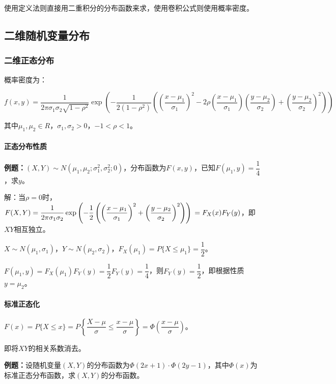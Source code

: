 \documentclass[UTF8, 12pt]{ctexart}
\begin{document}
使用定义法则直接用二重积分的分布函数来求，使用卷积公式则使用概率密度。

\subsection{二维随机变量分布}

\subsubsection{二维正态分布}

概率密度为：

{\fontsize{8.2pt}{10pt}$f(x,y)=\dfrac{1}{2\pi\sigma_1\sigma_2\sqrt{1-\rho^2}}\exp\left(-\dfrac{1}{2(1-\rho^2)}\left(\left(\dfrac{x-\mu_1}{\sigma_1}\right)^2-2\rho\left(\dfrac{x-\mu_1}{\sigma_1}\right)\left(\dfrac{y-\mu_2}{\sigma_2}\right)+\left(\dfrac{y-\mu_2}{\sigma_2}\right)^2\right)\right)$}

其中$\mu_1,\mu_2\in R$，$\sigma_1,\sigma_2>0$，$-1<\rho<1$。

\paragraph{正态分布性质} \leavevmode \medskip

\textbf{例题：}$(X,Y)\sim N(\mu_1,\mu_2;\sigma_1^2,\sigma_2^2;0)$，分布函数为$F(x,y)$，已知$F(\mu_1,y)=\dfrac{1}{4}$，求$y$。

解：当$\rho=0$时，$F(X,Y)=\dfrac{1}{2\pi\sigma_1\sigma_2}\exp\left(-\dfrac{1}{2}\left(\left(\dfrac{x-\mu_1}{\sigma_1}\right)^2+\left(\dfrac{y-\mu_2}{\sigma_2}\right)^2\right)\right)\\=F_X(x)F_Y(y)$，即$XY$相互独立。

$X\sim N(\mu_1,\sigma_1)$，$Y\sim N(\mu_2,\sigma_2)$，$F_X(\mu_1)=P\{X\leqslant\mu_1\}=\dfrac{1}{2}$。

$F(\mu_1,y)=F_X(\mu_1)F_Y(y)=\dfrac{1}{2}F_Y(y)=\dfrac{1}{4}$，则$F_Y(y)=\dfrac{1}{2}$，即根据性质$y=\mu_2$。

\paragraph{标准正态化} \leavevmode \medskip

$F(x)=P\{X\leqslant x\}=P\left\{\dfrac{X-\mu}{\sigma}\leqslant\dfrac{x-\mu}{\sigma}\right\}=\varPhi\left(\dfrac{x-\mu}{\sigma}\right)$。

即将$XY$的相关系数消去。

\textbf{例题：}设随机变量$(X,Y)$的分布函数为$\varPhi(2x+1)\cdot\varPhi(2y-1)$，其中$\varPhi(x)$为标准正态分布函数，求$(X,Y)$的分布函数。
\end{document}
